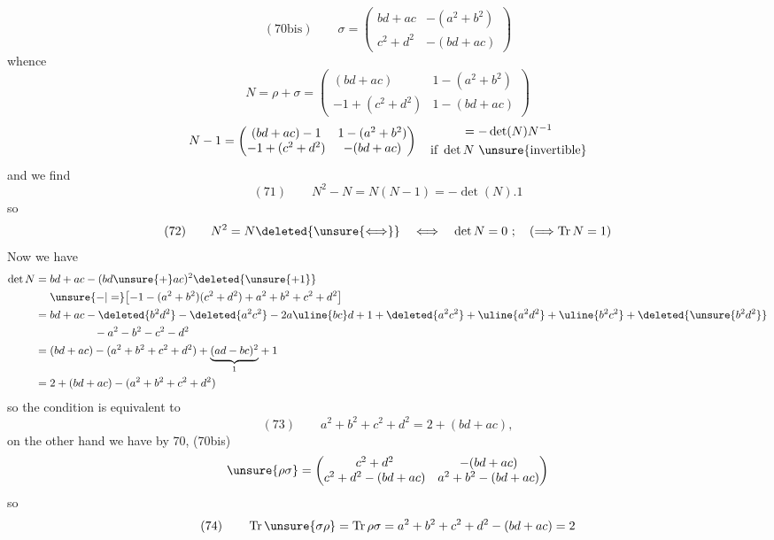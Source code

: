 \[
(70\mathrm{bis})\qquad
\sigma=\begin{pmatrix}
bd+ac&-(a^2+b^2)\\
c^2+d^2&-(bd+ac)
\end{pmatrix}
\]
whence
\[
N=\rho+\sigma=\begin{pmatrix}
(bd+ac)&1-(a^2+b^2)\\
-1+(c^2+d^2)&1-(bd+ac)
\end{pmatrix}
\]
\[
N-1=\begin{pmatrix}
(bd+ac)-1&1-(a^2+b^2)\\
-1+(c^2+d^2)&-(bd+ac)
\end{pmatrix}
\quad\begin{gathered}
=-\det(N)N^{-1}\\
\text{if }\det N\text{ \unsure{invertible}}
\end{gathered}
\]
and we find
\[
(71)\qquad N^2-N=N(N-1)=-\det(N).1
\]
so 
\[
(72)\qquad N^2=N\deleted{\unsure{\Longleftrightarrow}}\quad\Longleftrightarrow\quad\det N=0\ ;\quad(\Longrightarrow\operatorname{Tr}N=1)
\]
Now we have
\[
\begin{aligned}
\det N={}&bd+ac-(bd\unsure{+}ac)^2\deleted{\unsure{+1}}\\
&\unsure{-|=}\bigl[-1-(a^2+b^2)(c^2+d^2)+a^2+b^2+c^2+d^2\bigr]\\
={}&bd+ac-\deleted{b^2d^2}-\deleted{a^2c^2}-2a\uline{bc}d+1
+\deleted{a^2c^2}+\uline{a^2d^2}+\uline{b^2c^2}+\deleted{\unsure{b^2d^2}}\\
&\hspace{4em}-a^2-b^2-c^2-d^2\\
={}&(bd+ac)-(a^2+b^2+c^2+d^2)+\underset{1}{\underbrace{(ad-bc)^2}}+1\\
={}&2+(bd+ac)-(a^2+b^2+c^2+d^2)
\end{aligned}
\]
so the condition  is equivalent to
\[
(73)\qquad a^2+b^2+c^2+d^2=2+(bd+ac),
\]
on the other hand we have by 70, (70bis)
\[
\unsure{\rho\sigma}=\begin{pmatrix}
c^2+d^2&-(bd+ac)\\
c^2+d^2-(bd+ac)&a^2+b^2-(bd+ac)
\end{pmatrix}
\]
so
\[
(74)\qquad \operatorname{Tr}\unsure{\sigma\rho}=\operatorname{Tr}\rho\sigma
=a^2+b^2+c^2+d^2-(bd+ac)=2
\]
